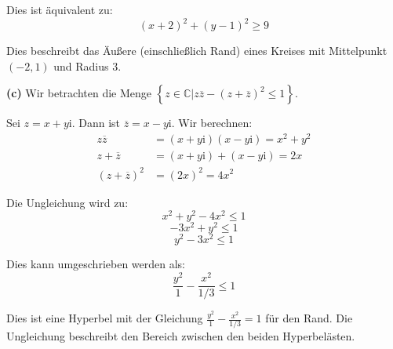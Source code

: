 \documentclass{article}
\newcommand{\im}{\mathrm{i}}
\newcommand{\C}{\mathbb{C}}
\newcommand{\conj}[1]{\overline{#1}}
\newcommand{\Set}[1]{\left\{#1\right\}}
\begin{document}
Dies ist äquivalent zu:
$$(x + 2)^2 + (y - 1)^2 \geq 9$$

Dies beschreibt das Äußere (einschließlich Rand) eines Kreises mit Mittelpunkt $(-2, 1)$ und Radius $3$.

\textbf{(c)} Wir betrachten die Menge $\Set{ z \in \C | z \conj{z} - (z + \conj{z} )^2 \leq 1 }$.

Sei $z = x + y\im$. Dann ist $\conj{z} = x - y\im$. Wir berechnen:
\begin{align}
z \conj{z} &= (x + y\im)(x - y\im) = x^2 + y^2 \\
z + \conj{z} &= (x + y\im) + (x - y\im) = 2x \\
(z + \conj{z})^2 &= (2x)^2 = 4x^2
\end{align}

Die Ungleichung wird zu:
$$x^2 + y^2 - 4x^2 \leq 1$$
$$-3x^2 + y^2 \leq 1$$
$$y^2 - 3x^2 \leq 1$$

Dies kann umgeschrieben werden als:
$$\frac{y^2}{1} - \frac{x^2}{1/3} \leq 1$$

Dies ist eine Hyperbel mit der Gleichung $\frac{y^2}{1} - \frac{x^2}{1/3} = 1$ für den Rand. Die Ungleichung beschreibt den Bereich zwischen den beiden Hyperbelästen.
\end{document}
